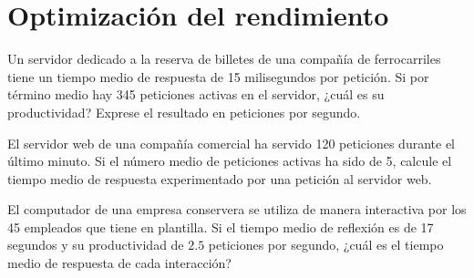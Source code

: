 \section{Optimización del rendimiento}

\begin{ejercicio}\label{ej:5.1}
    Un servidor dedicado a la reserva de billetes de una compañía de ferrocarriles tiene un tiempo medio de respuesta de 15 milisegundos por petición. Si por término medio hay 345 peticiones activas en el servidor, ¿cuál es su productividad? Exprese el resultado en peticiones por segundo.
\end{ejercicio}
\begin{comment}
\solucion
    La productividad del servidor es de 23000 peticiones por segundo.
\end{comment}

\begin{ejercicio}\label{ej:5.2}
    El servidor web de una compañía comercial ha servido 120 peticiones durante el último minuto. Si el número medio de peticiones activas ha sido de 5, calcule el tiempo medio de respuesta experimentado por una petición al servidor web.
\end{ejercicio}
\begin{comment}
\solucion
    El tiempo medio de respuesta es de 2,5 segundos.
\end{comment}

\begin{ejercicio}\label{ej:5.3}
    El computador de una empresa conservera se utiliza de manera interactiva por los 45 empleados que tiene en plantilla. Si el tiempo medio de reflexión es de 17 segundos y su productividad de $2.5$ peticiones por segundo, ¿cuál es el tiempo medio de respuesta de cada interacción?
\end{ejercicio}
\begin{comment}
\solucion
    El tiempo medio de respuesta de cada interacción es de 1 segundo.
\end{comment}

